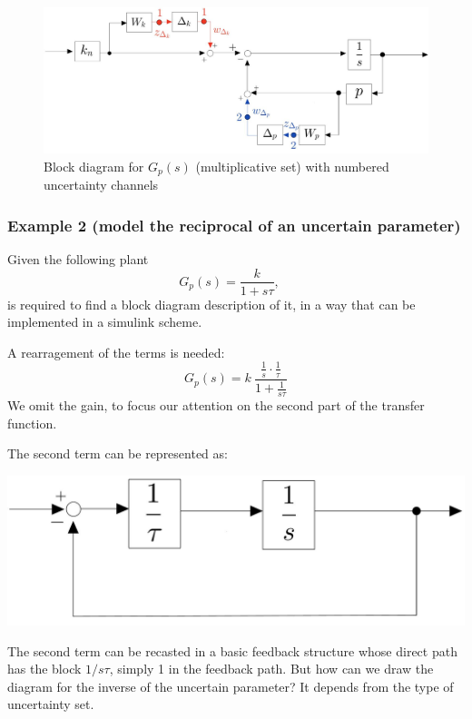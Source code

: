 \documentclass[a4paper, 12pt]{article}
\begin{document}
\begin{figure}
    \centering
    \includegraphics[scale=0.3]{img/ex2_num.jpg}
    \caption{Block diagram for $G_p(s)$ (multiplicative set) with numbered uncertainty channels}
\end{figure}

\newpage
\subsubsection*{Example 2 (model the reciprocal of an uncertain parameter)}
Given the following plant
\begin{equation}
    G_p(s)=\frac{k}{1+s\tau}, \quad     
\end{equation}
is required to find a block diagram description of it, in a way that can be implemented in a simulink scheme. 
\begin{multicols}{2}
    \noindent
    A rearragement of the terms is needed: 
\begin{equation}
    G_p(s)=k \ \frac{\frac{1}{s}\cdot \frac{1}{\tau}}{1+\frac{1}{s\tau}}
\end{equation}
We omit the gain, to focus our attention on the second part of the transfer function.

\newcolumn
The second term can be represented as:
\begin{center}
    \includegraphics[scale=0.13]{img/tau.jpg}
\end{center}
\end{multicols}


\noindent
The second term can be recasted in a basic feedback structure whose direct path has the block $1/{s\tau}$, simply 1 in the feedback path. But how can we draw the diagram for the inverse of the uncertain parameter? It depends from the type of uncertainty set. 
\end{document}
